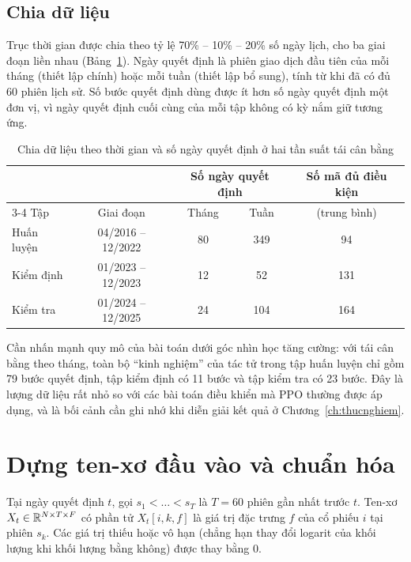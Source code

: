 \subsection{Chia dữ liệu}

Trục thời gian được chia theo tỷ lệ 70\% -- 10\% -- 20\% số ngày lịch, cho ba giai đoạn liền nhau (Bảng~\ref{tab:split}). Ngày quyết định là phiên giao dịch đầu tiên của mỗi tháng (thiết lập chính) hoặc mỗi tuần (thiết lập bổ sung), tính từ khi đã có đủ 60 phiên lịch sử. Số bước quyết định dùng được ít hơn số ngày quyết định một đơn vị, vì ngày quyết định cuối cùng của mỗi tập không có kỳ nắm giữ tương ứng.

\begin{table}[ht]
\centering\small
\caption{Chia dữ liệu theo thời gian và số ngày quyết định ở hai tần suất tái cân bằng}
\label{tab:split}
\begin{tabular}{@{}lcccc@{}}
\toprule
 & & \multicolumn{2}{c}{Số ngày quyết định} & Số mã đủ điều kiện \\
\cmidrule(lr){3-4}
Tập & Giai đoạn & Tháng & Tuần & (trung bình) \\
\midrule
Huấn luyện & 04/2016 -- 12/2022 & 80 & 349 & 94 \\
Kiểm định & 01/2023 -- 12/2023 & 12 & 52 & 131 \\
Kiểm tra & 01/2024 -- 12/2025 & 24 & 104 & 164 \\
\bottomrule
\end{tabular}
\end{table}

Cần nhấn mạnh quy mô của bài toán dưới góc nhìn học tăng cường: với tái cân bằng theo tháng, toàn bộ ``kinh nghiệm'' của tác tử trong tập huấn luyện chỉ gồm 79 bước quyết định, tập kiểm định có 11 bước và tập kiểm tra có 23 bước. Đây là lượng dữ liệu rất nhỏ so với các bài toán điều khiển mà PPO thường được áp dụng, và là bối cảnh cần ghi nhớ khi diễn giải kết quả ở Chương~\ref{ch:thucnghiem}.

\section{Dựng ten-xơ đầu vào và chuẩn hóa}
\label{sec:snapshot}

Tại ngày quyết định $t$, gọi $s_1<\dots<s_T$ là $T=60$ phiên gần nhất trước $t$. Ten-xơ $X_t\in\mathbb{R}^{N\times T\times F}$ có phần tử $X_t[i,k,f]$ là giá trị đặc trưng $f$ của cổ phiếu $i$ tại phiên $s_k$. Các giá trị thiếu hoặc vô hạn (chẳng hạn thay đổi logarit của khối lượng khi khối lượng bằng không) được thay bằng $0$.

